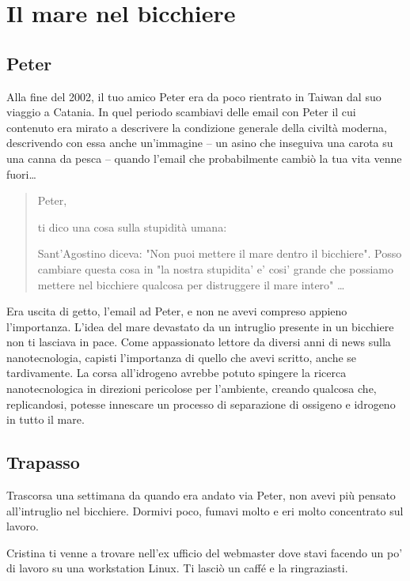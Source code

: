 \chapter{Il mare nel bicchiere}
\label{il_mare_nel_bicchiere} %

\section{Peter}
\label{defs}

Alla fine del 2002, il tuo amico Peter era da poco rientrato in Taiwan dal suo viaggio a Catania. In quel periodo scambiavi delle email con Peter il cui contenuto era mirato a descrivere la condizione generale della civiltà moderna, descrivendo con essa anche un'immagine -- un asino che inseguiva una carota su una canna da pesca -- quando l'email che probabilmente cambiò la tua vita venne fuori\ldots

\begin{quote}
{\ttfamily\small
Peter,

ti dico una cosa sulla stupidità umana:

Sant'Agostino diceva: "Non puoi mettere il mare dentro il bicchiere". Posso cambiare questa cosa in "la nostra stupidita' e' cosi' grande che possiamo mettere nel bicchiere qualcosa per distruggere il mare intero" \ldots
}
\end{quote}

Era uscita di getto, l'email ad Peter, e non ne avevi compreso appieno l'importanza. L'idea del mare devastato da un intruglio presente in un bicchiere non ti lasciava in pace. Come appassionato lettore da diversi anni di news sulla nanotecnologia, capisti l'importanza di quello che avevi scritto, anche se tardivamente. La corsa all'idrogeno avrebbe potuto spingere la ricerca nanotecnologica in direzioni pericolose per l'ambiente, creando qualcosa che, replicandosi, potesse innescare un processo di separazione di ossigeno e idrogeno in tutto il mare.

\section{Trapasso}
\label{trapasso}

Trascorsa una settimana da quando era andato via Peter, non avevi più pensato all'intruglio nel bicchiere. Dormivi poco, fumavi molto e eri molto concentrato sul lavoro.

Cristina ti venne a trovare nell'ex ufficio del webmaster dove stavi facendo un po' di lavoro su una workstation Linux. Ti lasciò un caffé e la ringraziasti.

